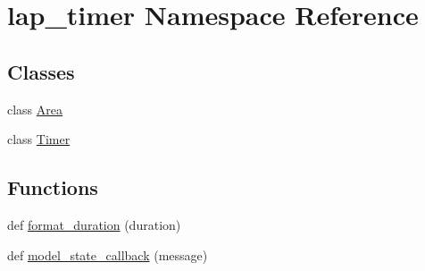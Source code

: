 \hypertarget{namespacelap__timer}{}\section{lap\+\_\+timer Namespace Reference}
\label{namespacelap__timer}
\subsection*{Classes}
\begin{DoxyCompactItemize}
\item 
class \hyperlink{classlap__timer_1_1_area}{Area}
\item 
class \hyperlink{classlap__timer_1_1_timer}{Timer}
\end{DoxyCompactItemize}
\subsection*{Functions}
\begin{DoxyCompactItemize}
\item 
def \hyperlink{namespacelap__timer_a7d41ff473803df11a493382fc80b2cb7}{format\+\_\+duration} (duration)
\item 
def \hyperlink{namespacelap__timer_a60b42977737ca2088ea8aaa1b8305c17}{model\+\_\+state\+\_\+callback} (message)
\end{DoxyCompactItemize}
